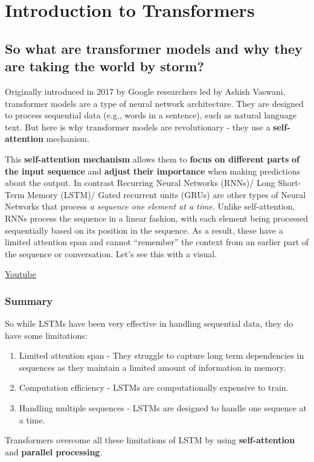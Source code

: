 \chapter{Introduction to Transformers}

\section{So what are transformer models and why they are taking the world by storm?}

Originally introduced in 2017 by Google researchers led by Ashish Vaswani, transformer models are a type of neural network architecture. They are designed to process sequential data (e.g., words in a sentence), such as natural language text. But here is why transformer models are revolutionary - they use a \textbf{self-attention} mechanism.\newline

This \textbf{self-attention mechanism} allows them to \textbf{focus on different parts} \textbf{of the input sequence} and \textbf{adjust} \textbf{their importance} when making predictions about the output. In contrast Recurring Neural Networks (RNNs)/ Long Short-Term Memory (LSTM)/ Gated recurrent units (GRUs) are other types of Neural Networks that process \textit{a sequence one element at a time}. Unlike self-attention, RNNs process the sequence in a linear fashion, with each element being processed sequentially based on its position in the sequence. As a result, these have a limited attention span and cannot “remember” the context from an earlier part of the sequence or conversation. Let’s see this with a visual. \newline

\href{https://www.youtube.com/watch?v=6c4bkZyztSA&ab_channel=Udacity}{Youtube} 

\subsection{Summary}

So while LSTMs have been very effective in handling sequential data, they do have some limitations:

\begin{enumerate}
    \item Limited attention span - They struggle to capture long term dependencies in sequences as they maintain a limited amount of information in memory.
    \item Computation efficiency - LSTMs are computationally expensive to train.
    \item Handling multiple sequences - LSTMs are designed to handle one sequence at a time.
\end{enumerate}
Transformers overcome all these limitations of LSTM by using \textbf{self-attention} and \textbf{parallel processing}. \newline

